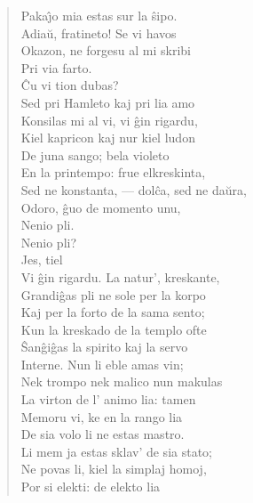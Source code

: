 \begin{verse}

 Paka\^{\j}o mia estas sur la \^sipo.\\
                Adia\u u, fratineto! Se vi havos\\
                Okazon, ne forgesu al mi skribi\\
                Pri via farto.\\
 \^Cu vi tion dubas?\\
 Sed pri Hamleto kaj pri lia amo\\
                Konsilas mi al vi, vi \^gin rigardu,\\
                Kiel kapricon kaj nur kiel ludon\\
                De juna sango; bela violeto\\
                En la printempo: frue elkreskinta,\\
                Sed ne konstanta, --- dol\^ca, sed ne da\u ura,\\
                Odoro, \^guo de momento unu,\\
                Nenio pli.\\
 Nenio pli?\\
 Jes, tiel\\
                Vi \^gin rigardu. La natur', kreskante,\\
                Grandi\^gas pli ne sole per la korpo\\
                Kaj per la forto de la sama sento;\\
                Kun la kreskado de la templo ofte\\
                \^San\^gi\^gas la spirito kaj la servo\\
                Interne. Nun li eble amas vin;\\
                Nek trompo nek malico nun makulas\\
                La virton de l' animo lia: tamen\\
                Memoru vi, ke en la rango lia\\
                De sia volo li ne estas mastro.\\
                Li mem ja estas sklav' de sia stato;\\
                Ne povas li, kiel la simplaj homoj,\\
                Por si elekti: de elekto lia\\

\end{verse}
